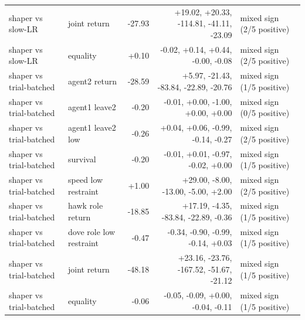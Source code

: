\begin{tabular}{llrrl}
shaper vs slow-LR & joint return & -27.93 & +19.02, +20.33, -114.81, -41.11, -23.09 & mixed sign (2/5 positive) \\
shaper vs slow-LR & equality & +0.10 & -0.02, +0.14, +0.44, -0.00, -0.08 & mixed sign (2/5 positive) \\
shaper vs trial-batched & agent2 return & -28.59 & +5.97, -21.43, -83.84, -22.89, -20.76 & mixed sign (1/5 positive) \\
shaper vs trial-batched & agent1 leave2 & -0.20 & -0.01, +0.00, -1.00, +0.00, +0.00 & mixed sign (0/5 positive) \\
shaper vs trial-batched & agent1 leave2 low & -0.26 & +0.04, +0.06, -0.99, -0.14, -0.27 & mixed sign (2/5 positive) \\
shaper vs trial-batched & survival & -0.20 & -0.01, +0.01, -0.97, -0.02, +0.00 & mixed sign (1/5 positive) \\
shaper vs trial-batched & speed low restraint & +1.00 & +29.00, -8.00, -13.00, -5.00, +2.00 & mixed sign (2/5 positive) \\
shaper vs trial-batched & hawk role return & -18.85 & +17.19, -4.35, -83.84, -22.89, -0.36 & mixed sign (1/5 positive) \\
shaper vs trial-batched & dove role low restraint & -0.47 & -0.34, -0.90, -0.99, -0.14, +0.03 & mixed sign (1/5 positive) \\
shaper vs trial-batched & joint return & -48.18 & +23.16, -23.76, -167.52, -51.67, -21.12 & mixed sign (1/5 positive) \\
shaper vs trial-batched & equality & -0.06 & -0.05, -0.09, +0.00, -0.04, -0.11 & mixed sign (1/5 positive) \\
\bottomrule
\end{tabular}
